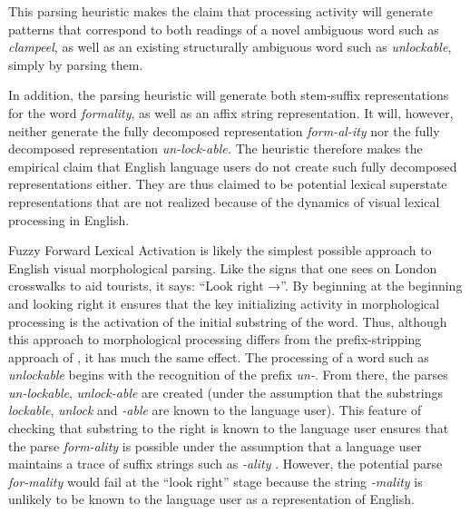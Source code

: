 \documentclass[output=paper]{langsci/langscibook}
\begin{document}
This parsing heuristic makes the claim that processing activity will generate patterns that correspond to both readings of a novel ambiguous word such as \textit{clampeel}, as well as an existing structurally ambiguous word such as \textit{unlockable}, simply by parsing them.

In addition, the parsing heuristic will generate both stem-suffix representations for the word \textit{formality}, as well as an affix string representation. It will, however, neither generate the fully decomposed representation \textit{form-al-ity} nor the fully decomposed representation \textit{un-lock-able.} The heuristic therefore makes the empirical claim that English language users do not create such fully decomposed representations either.  They are thus claimed to be potential lexical superstate representations that are not realized because of the dynamics of visual lexical processing in English.


Fuzzy Forward Lexical Activation is likely the simplest possible approach to English visual morphological parsing. Like the signs that one sees on London crosswalks to aid tourists, it says: “Look right →”.  By beginning at the beginning and looking right it ensures that the key initializing activity in morphological processing is the activation of the initial substring of the word. Thus, although this approach to morphological processing differs from the prefix-stripping approach of \citet{TaftForster1975}, it has much the same effect.  The processing of a word such as \textit{unlockable} begins with the recognition of the prefix \textit{un-}. 
From there, the parses \textit{un-lockable}, \textit{unlock-able} are created (under the assumption that the substrings \textit{lockable}, \textit{unlock} and \textit{-able} are known to the language user). This feature of checking that substring to the right is known to the language user ensures that the parse \textit{form-ality} is possible under the assumption that a language user maintains a trace of suffix strings such as \textit{-ality} \citep{Derwing2014,LibbenJaremaEtAl2016}.  However, the potential parse \textit{for-mality} would fail at the “look right” stage because the string \textit{-mality} is unlikely to be known to the language user as a representation of English.
\end{document}
